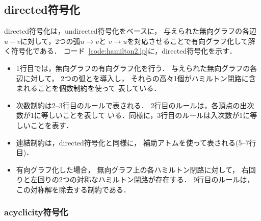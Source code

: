 \subsection{\textsf{directed}符号化}



\textsf{directed}符号化は，\textsf{undirected}符号化をベースに，
与えられた無向グラフの各辺$u-v$に対して，2つの弧$u\rightarrow v$と
$v\rightarrow u$を対応させることで有向グラフ化して解く符号化である．
コード~\ref{code:hamilton2.lp}に，\textsf{directed}符号化を示す．
\begin{itemize}
\item 1行目では，無向グラフの有向グラフ化を行う．
  与えられた無向グラフの各辺に対して，
  2つの弧とを導入し，
  それらの高々1個がハミルトン閉路に含まれることを個数制約を使って
  表している．
\item 次数制約は2--3行目のルールで表される．
  2行目のルールは，各頂点の出次数が1に等しいことを表して
  いる．同様に，3行目のルールは入次数が1に等しいことを表す．
\item 連結制約は，\textsf{directed}符号化と同様に，
  補助アトムを使って表される(5--7行目)．
\item 有向グラフ化した場合，
  無向グラフ上の各ハミルトン閉路に対して，
  右回りと左回りの2つの対称なハミルトン閉路が存在する．
  9行目のルールは，この対称解を除去する制約である．
\end{itemize}

\subsubsection{\textsf{acyclicity}符号化}



